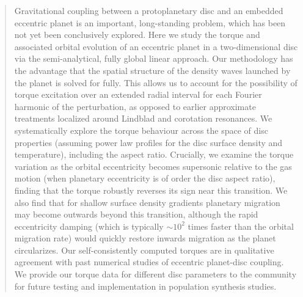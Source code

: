 \begin{abstract}
Gravitational coupling between a protoplanetary disc and an embedded eccentric planet is an important, long-standing problem, which has been not yet been conclusively explored. Here we study the torque and associated orbital evolution of an eccentric planet in a two-dimensional disc via the semi-analytical, fully global linear approach. Our methodology has the advantage that the spatial structure of the density waves launched by the planet is solved for fully. This allows us to account for the possibility of torque excitation over an extended radial interval for each Fourier harmonic of the perturbation, as opposed to earlier approximate treatments localized around Lindblad and corotation resonances. We systematically explore the torque behaviour across the space of disc properties (assuming power law profiles for the disc surface density and temperature), including the aspect ratio. Crucially, we examine the torque variation as the orbital eccentricity becomes supersonic relative to the gas motion (when planetary eccentricity is of order the disc aspect ratio), finding that the torque robustly reverses its sign near this transition. We also find that for shallow surface density gradients planetary migration may become outwards beyond this transition, although the rapid eccentricity damping (which is typically $\sim 10^2$ times faster than the orbital migration rate) would quickly restore inwards migration as the planet circularizes. Our self-consistently computed torques are in qualitative agreement with past numerical studies of eccentric planet-disc coupling. We provide our torque data for different disc parameters to the community for future testing and implementation in population synthesis studies.
\end{abstract}
